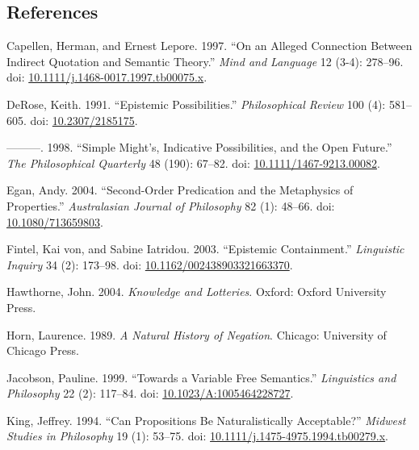 \documentclass[
  11pt,
  letterpaper,
  DIV=11,
  numbers=noendperiod,
  twoside]{scrartcl}
\newlength{\cslhangindent}
\newenvironment{CSLReferences}[2] %
 {\begin{list}{}{%
  \setlength{\itemindent}{0pt}
  \setlength{\leftmargin}{0pt}
  \setlength{\parsep}{0pt}
  \ifodd #1
   \setlength{\leftmargin}{\cslhangindent}
   \setlength{\itemindent}{-1\cslhangindent}
  \fi
  \setlength{\itemsep}{#2\baselineskip}}}
 {\end{list}}
\begin{document}
\subsection*{References}\label{references}

\label{refs}
\begin{CSLReferences}{1}{0}
Capellen, Herman, and Ernest Lepore. 1997. {``On an Alleged Connection
Between Indirect Quotation and Semantic Theory.''} \emph{Mind and
Language} 12 (3-4): 278--96. doi:
\href{https://doi.org/10.1111/j.1468-0017.1997.tb00075.x}{10.1111/j.1468-0017.1997.tb00075.x}.

DeRose, Keith. 1991. {``Epistemic Possibilities.''} \emph{Philosophical
Review} 100 (4): 581--605. doi:
\href{https://doi.org/10.2307/2185175}{10.2307/2185175}.

---------. 1998. {``Simple Might's, Indicative Possibilities, and the
Open Future.''} \emph{The Philosophical Quarterly} 48 (190): 67--82.
doi:
\href{https://doi.org/10.1111/1467-9213.00082}{10.1111/1467-9213.00082}.

Egan, Andy. 2004. {``Second-Order Predication and the Metaphysics of
Properties.''} \emph{Australasian Journal of Philosophy} 82 (1): 48--66.
doi: \href{https://doi.org/10.1080/713659803}{10.1080/713659803}.

Fintel, Kai von, and Sabine Iatridou. 2003. {``Epistemic Containment.''}
\emph{Linguistic Inquiry} 34 (2): 173--98. doi:
\href{https://doi.org/10.1162/002438903321663370}{10.1162/002438903321663370}.

Hawthorne, John. 2004. \emph{Knowledge and Lotteries}. Oxford: Oxford
University Press.

Horn, Laurence. 1989. \emph{A Natural History of Negation}. Chicago:
University of Chicago Press.

Jacobson, Pauline. 1999. {``Towards a Variable Free Semantics.''}
\emph{Linguistics and Philosophy} 22 (2): 117--84. doi:
\href{https://doi.org/10.1023/A:1005464228727}{10.1023/A:1005464228727}.

King, Jeffrey. 1994. {``Can Propositions Be Naturalistically
Acceptable?''} \emph{Midwest Studies in Philosophy} 19 (1): 53--75. doi:
\href{https://doi.org/10.1111/j.1475-4975.1994.tb00279.x}{10.1111/j.1475-4975.1994.tb00279.x}.


\end{CSLReferences}
\end{document}
